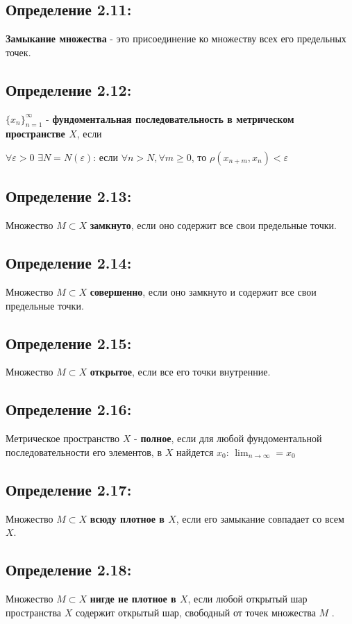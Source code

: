 \documentclass[12pt, english]{article}
\begin{document}
\subsection*{Определение 2.11:}
	 \textbf{Замыкание множества} - это присоединение ко множеству всех его предельных точек.

\subsection*{Определение 2.12:}
	 $\{{x_n}\}_{n = 1}^{\infty}$ - \textbf{фундоментальная последовательность в метрическом пространстве $X$}, если
	 
	 $\forall \varepsilon > 0$ $ \exists N = N(\varepsilon)$: 
	 если $\forall n > N, \forall m \ge 0$, то 
	 $\rho(x_{n+m}, x_n) < \varepsilon$
	 
\subsection*{Определение 2.13:} \label{eq101}
	 Множество $M \subset X$ \textbf{замкнуто}, если оно содержит все свои предельные точки.

\subsection*{Определение 2.14:}
	 Множество $M \subset X$\textbf{ совершенно}, если оно замкнуто и содержит все свои предельные точки.
	 
\subsection*{Определение 2.15:}
	 Множество $M \subset X$ \textbf{открытое}, если все его точки внутренние.
	 
\subsection*{Определение 2.16:}
	 Метрическое пространство $X$ - \textbf{полное}, если для любой фундоментальной последовательности его элементов, 
	 в $X$ найдется $x_0$: $\lim_{n \to \infty} = x_0$

\subsection*{Определение 2.17:}
 Множество $M \subset X$ \textbf{всюду плотное в $X$}, если его замыкание совпадает со всем $X$.
 
\subsection*{Определение 2.18:}
 Множество $M \subset X$ \textbf{нигде не  плотное в $X$}, если любой открытый шар пространства $X$
содержит открытый шар, свободный от точек множества $M$ .
	 	
\end{document}
